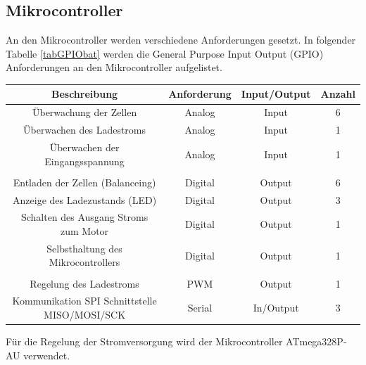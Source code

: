 \subsection*{Mikrocontroller}
An den Mikrocontroller werden verschiedene Anforderungen gesetzt.
In folgender Tabelle \ref{tabGPIObat} werden die General Purpose Input Output (GPIO) Anforderungen an den Mikrocontroller aufgelistet.
\begin{center}
	\begin{tabular}{|c|c|c|c|}
		\hline 
		Beschreibung & Anforderung & Input/Output & Anzahl \\ 
		\hline 
		Überwachung der Zellen & Analog & Input & 6 \\ 
		\hline 
		Überwachen des Ladestroms &	Analog & Input & 1 \\ 
		\hline 
		Überwachen der Eingangsspannung & Analog & Input & 1 \\ 
		\hline 
		&  &  &  \\ 
		\hline 
		Entladen der Zellen (Balanceing) & Digital  & Output & 6 \\ 
		\hline 
		Anzeige des Ladezustands (LED) & Digital & Output & 3 \\ 
		\hline 
		Schalten des Ausgang Stroms zum Motor & Digital & Output & 1 \\ 
		\hline 
		Selbsthaltung des Mikrocontrollers & Digital & Output & 1 \\ 
		\hline 
		&  &  &  \\ 
		\hline 
		Regelung des Ladestroms & PWM & Output & 1 \\ 
		\hline 
		Kommunikation SPI Schnittstelle MISO/MOSI/SCK & Serial & In/Output & 3 \\ 
		\hline 
	\end{tabular} 
	\label{tabGPIObat}
\end{center}
Für die Regelung der Stromversorgung wird der Mikrocontroller ATmega328P-AU verwendet.
